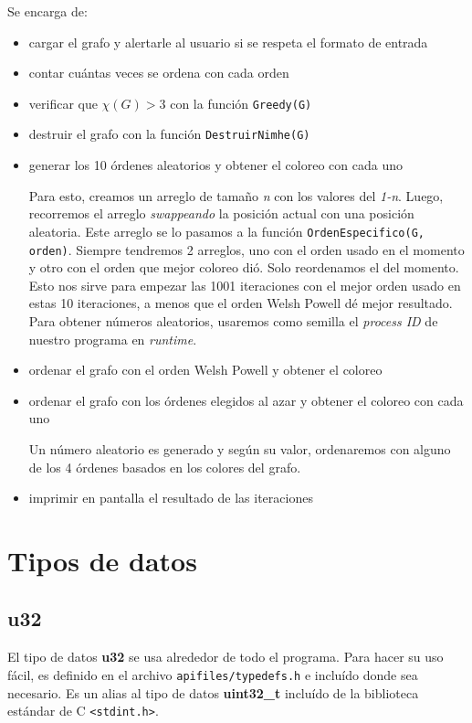 \documentclass[11pt]{article}   	%
\begin{document}
Se encarga de:
\begin{itemize}
\item cargar el grafo y alertarle al usuario si se respeta el formato de entrada
\item contar cuántas veces se ordena con cada orden
\item verificar que $\chi(G)>3$ con la función \texttt{Greedy(G)}
\item destruir el grafo con la función \texttt{DestruirNimhe(G)}
\item generar los 10 órdenes aleatorios y obtener el coloreo con cada uno

Para esto, creamos un arreglo de tamaño \emph{n} con los valores del \emph{1-n}.
Luego, recorremos el arreglo \textit{swappeando} la posición actual con una posición aleatoria.
Este arreglo se lo pasamos a la función \texttt{OrdenEspecifico(G, orden)}.
Siempre tendremos 2 arreglos, uno con el orden usado en el momento y otro con el orden que mejor
coloreo dió. Solo reordenamos el del momento. Esto nos sirve para empezar las 1001 iteraciones con el mejor
orden usado en estas 10 iteraciones, a menos que el orden Welsh Powell dé mejor resultado.
Para obtener números aleatorios, usaremos como semilla el \emph{process ID} de nuestro programa en
\emph{runtime}.
\item ordenar el grafo con el orden Welsh Powell y obtener el coloreo
\item ordenar el grafo con los órdenes elegidos al azar y obtener el coloreo con cada uno

Un número aleatorio es generado y según su valor, ordenaremos con alguno de los 4 órdenes basados en los
colores del grafo.
\item imprimir en pantalla el resultado de las iteraciones
\end{itemize}
\clearpage

\section{Tipos de datos}
\subsection{u32}
El tipo de datos \textbf{u32} se usa alrededor de todo el programa. 
Para hacer su uso fácil, es definido en el archivo \texttt{apifiles/typedefs.h}
e incluído donde sea necesario. Es un alias al tipo de datos \textbf{uint32\_t}
incluído de la biblioteca estándar de C \texttt{<stdint.h>}.
\end{document}
